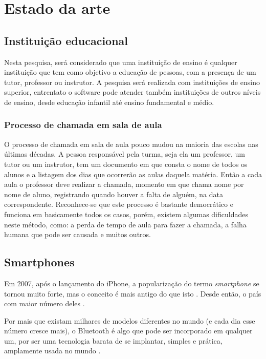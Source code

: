 \documentclass[
	12pt,
	oneside,
	a4paper,
	english,
	brazil,
]{abntex2}
\begin{document}
\chapter{Estado da arte}

\section{Instituição educacional}

Nesta pesquisa, será considerado que uma instituição de ensino é qualquer instituição que tem como objetivo a educação de pessoas, com a presença de um tutor, professor ou instrutor. A pesquisa será realizada com instituições de ensino superior, entrentato o software pode atender também instituições de outros níveis de ensino, desde educação infantil até ensino fundamental e médio.

\subsection{Processo de chamada em sala de aula}

O processo de chamada em sala de aula pouco mudou na maioria das escolas nas últimas décadas. A pessoa responsável pela turma, seja ela um professor, um tutor ou um instrutor, tem um documento em que consta o nome de todos os alunos e a listagem dos dias que ocorrerão as aulas daquela matéria. Então a cada aula o professor deve realizar a chamada, momento em que chama nome por nome de aluno, registrando quando houver a falta de alguém, na data correspondente. Reconhece-se que este processo é bastante democrático e funciona em basicamente todos os casos, porém, existem algumas dificuldades neste método, como: a perda de tempo de aula para fazer a chamada, a falha humana que pode ser causada e muitos outros.

\section{Smartphones}

Em 2007, após o lançamento do iPhone, a popularização do termo \emph{smartphone} se tornou muito forte, mas o conceito é mais antigo do que isto \cite{smartphone-history-pictures}. Desde então, o país com maior número deles \cite{smartphone-numbers}.

Por mais que existam milhares de modelos diferentes no mundo (e cada dia esse número cresce mais), o Bluetooth é algo que pode ser incorporado em qualquer um, por ser uma tecnologia barata de se implantar, simples e prática, amplamente usada no mundo \cite{smartphone-android-models}.
\end{document}
